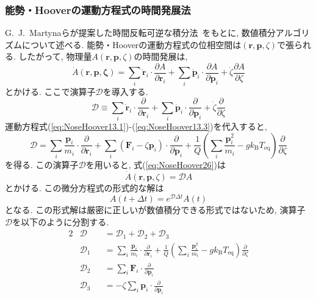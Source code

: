\subsubsection{能勢・Hooverの運動方程式の時間発展法}
G.~J.~Martynaらが提案した時間反転可逆な積分法~\cite{1992Tuckerman, 1996Martyna}をもとに,
数値積分アルゴリズムについて述べる.
能勢・Hooverの運動方程式の位相空間は$(\bm{r}, \bm{p}, \zeta)$で張られる.
したがって, 物理量$A(\bm{r}, \bm{p}, \zeta)$の時間発展は,
\begin{equation}
 \dot{A}(\bm{r}, \bm{p}, \bm{\zeta})
  =
  \sum_{i} \dot{\bm{r}}_{i} \cdot \frac{\partial A}{\partial \bm{r}_{i}}
  +
  \sum_{i} \dot{\bm{p}}_{i} \cdot \frac{\partial A}{\partial \bm{p}_{i}}
  +
  \dot{\zeta} \frac{\partial A}{\partial \zeta}
 \label{eq:NoseHoover26}
\end{equation}
とかける. ここで演算子$\mathcal{D}$を導入する.
\begin{equation}
 \mathcal{D}
  \equiv
  \sum_{i} \dot{\bm{r}}_{i} \cdot \frac{\partial}{\partial \bm{r}_{i}}
  +
  \sum_{i} \dot{\bm{p}}_{i} \cdot \frac{\partial}{\partial \bm{p}_{i}}
  +
  \dot{\zeta} \frac{\partial}{\partial \zeta}
 \label{eq:NoseHoover27}
\end{equation}
運動方程式(\ref{eq:NoseHoover13.1})-(\ref{eq:NoseHoover13.3})を代入すると,
\begin{equation}
 \mathcal{D}
  =
  \sum_{i} \frac{\bm{p}_{i}}{m_{i}} \cdot \frac{\partial}{\partial \bm{r}_{i}}
  +
  \sum_{i} (\bm{F}_{i} - \zeta \bm{p}_{i}) \cdot \frac{\partial}{\partial \bm{p}_{i}}
  +
  \frac{1}{Q}
  \left( \sum_{i} \frac{\bm{p}^{2}_{i}}{m_{i}} - g k_{\mathrm{B}} T_{\mathrm{eq}} \right)
  \frac{\partial}{\partial \zeta}
 \label{eq:NoseHoover28}
\end{equation}
を得る. この演算子$\mathcal{D}$を用いると, 式(\ref{eq:NoseHoover26})は
\begin{equation}
 \dot{A} \left( \bm{r}, \bm{p}, \zeta \right)
  =
  \mathcal{D} A
  \label{eq:NoseHoover29}
\end{equation}
とかける. この微分方程式の形式的な解は
\begin{equation}
 A(t + \Delta t)
  =
  e^{\mathcal{D} \Delta t} A(t)
  \label{eq:NoseHoover30}
\end{equation}
となる.
この形式解は厳密に正しいが数値積分できる形式ではないため, 演算子$\mathcal{D}$を以下のように分割する.
\begin{alignat}{2}
 &\mathcal{D}
 &&= \mathcal{D}_{1} + \mathcal{D}_{2} + \mathcal{D}_{3}
 \label{eq:NoseHoover31.1}
 \\
 &\mathcal{D}_{1}
 &&=
 \sum_{i} \frac{\bm{p}_{i}}{m_{i}} \cdot \frac{\partial}{\partial \bm{r}_{i}}
 +
 \frac{1}{Q}
 \left( \sum_{i} \frac{\bm{p}^{2}_{i}}{m_{i}} - g k_{\mathrm{B}} T_{\mathrm{eq}} \right)
 \frac{\partial}{\partial \zeta}
 \label{eq:NoseHoover31.2}
 \\
 &\mathcal{D}_{2}
 &&=
 \sum_{i} \bm{F}_{i} \cdot \frac{\partial}{\partial \bm{p}_{i}}
 \label{eq:NoseHoover31.3}
 \\
 &\mathcal{D}_{3}
 &&=
 - \zeta \sum_{i} \bm{p}_{i} \cdot \frac{\partial}{\partial \bm{p}_{i}}
 \label{eq:NoseHoover31.4}
\end{alignat}
